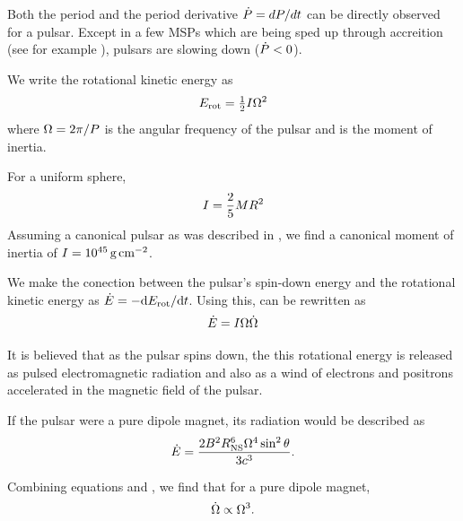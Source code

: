 Both the period \period and the period derivative
$\dot{P}=dP/dt$ can be directly observed for a pulsar.
Except in a few \acp{MSP} which are being sped up
through accreition (see for example \cite{falanga_2005_integral-observations}),
pulsars are slowing down ($\dot{P}<0$).

We write the rotational kinetic energy as
\begin{equation}\eqnlabel{rotational_energy}
  \energyrotational = \tfrac{1}{2} I \angularfrequency^2
\end{equation}
where $\Omega = 2\pi/P$ is
the angular frequency of the pulsar and
\momentofinertia is the moment of inertia.

For a uniform sphere,
\begin{equation}
  I = \frac{2}{5} M R^2
\end{equation}
Assuming a canonical pulsar as was described in ,
we find a canonical moment of inertia of 
$I=10^{45}\,\text{g}\,\text{cm}^{-2}$.

We make the conection between the pulsar's spin-down
energy and the rotational kinetic energy as $\dot{E} = -
\text{d}E_\text{rot}/\text{d}t$. Using this,
 can be rewritten as
\begin{equation}\eqnlabel{edot_from_rotation}
  \energydot = I \angularfrequency \angularfrequencydot
\end{equation}

It is believed that as the pulsar spins down, the this rotational energy
is released as pulsed electromagnetic radiation and also as a wind of
electrons and positrons accelerated in the magnetic field of the pulsar.

If the pulsar were a pure dipole magnet, its radiation would be
described as \citep{gunn_1969_magnetic-dipole}
\begin{equation}\eqnlabel{edot_pure_dipole}
  \energydot = \frac{2\MagneticField^2 \PulsarRadius^6 
  \angularfrequency^4 \sin^2\PulsarRotationAngle}{
  3\speedoflight^3}.
\end{equation}

Combining equations  and
, we find that for a pure dipole magnet,
\begin{equation}\eqnlabel{breaking_index_dipole}
\angularfrequencydot \propto \angularfrequency^3.
\end{equation}

